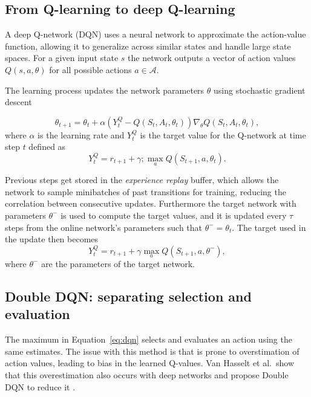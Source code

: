 \documentclass[11pt,a4paper]{article}
\begin{document}
\subsection{From Q-learning to deep Q-learning}
A deep Q-network (DQN) uses a neural network to approximate the action-value function, allowing it to generalize across similar states and handle large state spaces. 
For a given input state $s$ the network outputs a vector of action values $Q(s,a,\theta)$ for all possible actions $a \in \mathcal{A}$.

The learning process updates the network parameters $\theta$ using stochastic gradient descent

\begin{equation}
    \theta_{t+1} = \theta_t + \alpha\left(Y^Q_t - Q(S_t, A_t, \theta_t)\right) \nabla_\theta Q(S_t, A_t, \theta_t), 
\end{equation}
where $\alpha$ is the learning rate and $Y^Q_t$ is the target value for the Q-network at time step $t$ defined as
\begin{equation}
Y^Q_t = r_{t+1} + \gamma; \max_{a} Q(S_{t+1}, a, \theta_t).
\end{equation}

Previous steps get stored in the \emph{experience replay} buffer, which allows the network to sample minibatches of past transitions for training, reducing the correlation between consecutive updates.
Furthermore the target network with parameters $\theta^-$ is used to compute the target values, and it is updated every $\tau$ steps from the online network's parameters such that  $\theta^- = \theta_t$.
The target used in the update then becomes
\begin{equation}
Y^Q_t = r_{t+1} + \gamma \max_{a} Q(S_{t+1}, a, \theta^-),
\label{eq:dqn}
\end{equation}
where $\theta^-$ are the parameters of the target network.

\subsection{Double DQN: separating selection and evaluation}
The maximum in Equation~\eqref{eq:dqn} selects and evaluates an action using the same estimates. 
The issue with this method is that is prone to overstimation of action values, leading to bias in the learned Q-values.
Van Hasselt et al.\ show that this overestimation also occurs with deep networks and propose Double DQN to
reduce it \citep{vanhasselt2015double}.
\end{document}
